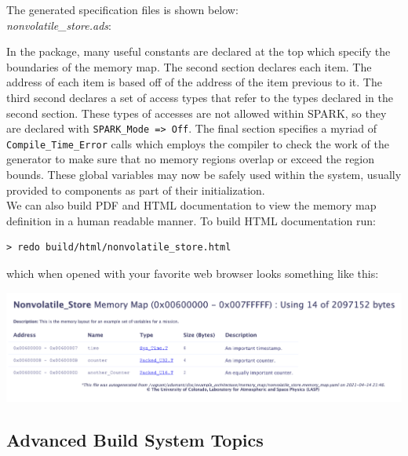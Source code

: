 The generated specification files is shown below: \\

\textit{nonvolatile\_store.ads}:

In the package, many useful constants are declared at the top which specify the boundaries of the memory map. The second section declares each item. The address of each item is based off of the address of the item previous to it. The third second declares a set of access types that refer to the types declared in the second section. These types of accesses are not allowed within SPARK, so they are declared with \texttt{SPARK\_Mode => Off}. The final section specifies a myriad of \texttt{Compile\_Time\_Error} calls which employs the compiler to check the work of the generator to make sure that no memory regions overlap or exceed the region bounds. These global variables may now be safely used within the system, usually provided to components as part of their initialization. \\

We can also build PDF and HTML documentation to view the memory map definition in a human readable manner. To build HTML documentation run:

\vspace{5mm} %
\begin{verbatim}
> redo build/html/nonvolatile_store.html
\end{verbatim}
\vspace{5mm} %

which when opened with your favorite web browser looks something like this:

\vspace{5mm} %
\includegraphics[width=\textwidth]{images/memorymaphtml.png}
\vspace{5mm} %

\subsection{Advanced Build System Topics}

